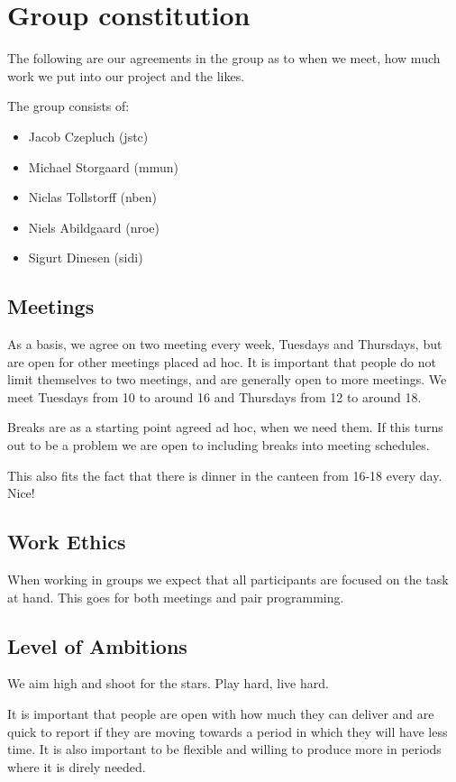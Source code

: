 \section{Group constitution}
\label{sec:group-constitution}

The following are our agreements in the group as to when we meet, how much work we put into our project and the likes.

The group consists of:
\begin{itemize}
    \item Jacob Czepluch (jstc)
    \item Michael Storgaard (mmun)
    \item Niclas Tollstorff (nben)
    \item Niels Abildgaard (nroe)
    \item Sigurt Dinesen (sidi)
\end{itemize}

\subsection{Meetings}
As a basis, we agree on two meeting every week, Tuesdays and Thursdays, but are open for other meetings placed ad hoc. It is important that people do not limit themselves to two meetings, and are generally open to more meetings. We meet Tuesdays from 10 to around 16 and Thursdays from 12 to around 18.

Breaks are as a starting point agreed ad hoc, when we need them. If this turns out to be a problem we are open to including breaks into meeting schedules.

This also fits the fact that there is dinner in the canteen from 16-18 every day. Nice!

\subsection{Work Ethics}
When working in groups we expect that all participants are focused on the task at hand. This goes for both meetings and pair programming.

\subsection{Level of Ambitions}
We aim high and shoot for the stars. Play hard, live hard.

It is important that people are open with how much they can deliver and are quick to report if they are moving towards a period in which they will have less time. It is also important to be flexible and willing to produce more in periods where it is direly needed.
